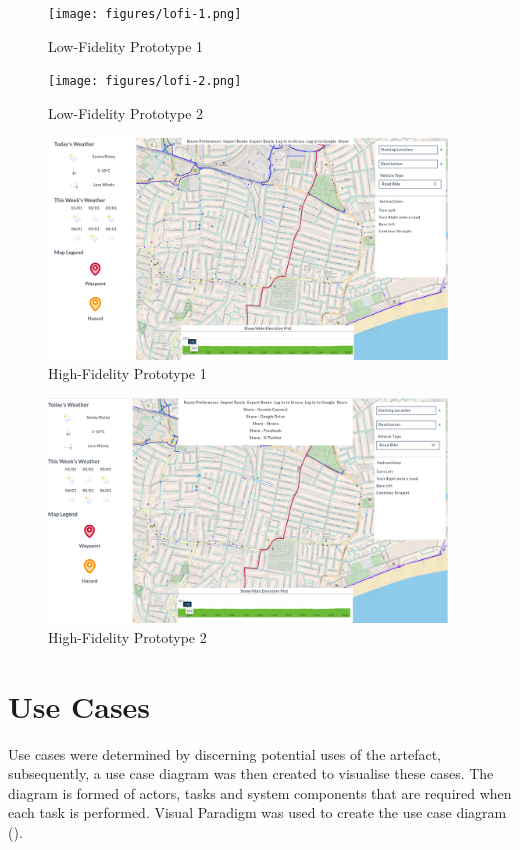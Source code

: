   \begin{figure}[!ht]
    \centering
    \texttt{[image: figures/lofi-1.png]}
    \caption{Low-Fidelity Prototype 1}
    \label{fig:lofi1}
  \end{figure}

  \begin{figure}[!ht]
    \centering
    \texttt{[image: figures/lofi-2.png]}
    \caption{Low-Fidelity Prototype 2}
    \label{fig:lofi2}
  \end{figure}

  \begin{figure}[!ht]
    \centering
    \includegraphics[width=400px]{figures/hifi-1.png}
    \caption{High-Fidelity Prototype 1}
    \label{fig:hifi1}
  \end{figure}

  \begin{figure}[!ht]
    \centering
    \includegraphics[width=400px]{figures/hifi-2.png}
    \caption{High-Fidelity Prototype 2}
    \label{fig:hifi2}
  \end{figure}

  \clearpage
\section{Use Cases}
\label{design:usecase}
Use cases were determined by discerning potential uses of the artefact, subsequently, a use case diagram was then created to visualise these cases. The diagram is formed of actors, tasks and system components that are required when each task is performed. Visual Paradigm was used to create the use case diagram (\cite{noauthor_ideal_nodate}).

